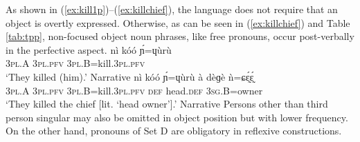 \documentclass[output=paper]{langscibook}
\begin{document}
As shown in (\ref{ex:kill1p})--(\ref{ex:killchief}), the language does not require that an object is overtly expressed. Otherwise, as can be seen in (\ref{ex:killchief}) and Table \ref{tab:tpp}, non-focused object noun phrases, like free pronouns, occur post-verbally in the perfective aspect.
\ea \label{ex:kill1p}
\gll nì kóó ɲ́=ɥùrù \\
3\textsc{pl}.A 3\textsc{pl}.\textsc{pfv} 3\textsc{pl}.B=kill.3\textsc{pl}.\textsc{pfv} \\
\glt `They killed (him).' Narrative \citep[~394]{HantganDiss}
\z
\ea \label{ex:killchief}
\gll nì kóó ɲ́=ɥùrù à dèɡè ǹ=ɕɛ̰́ɛ̰́\\
3\textsc{pl}.A 3\textsc{pl}.\textsc{pfv} 3\textsc{pl}.B=kill.3\textsc{pl}.\textsc{pfv} \textsc{def} head.\textsc{def} 3\textsc{sg}.B=owner\\
\glt `They killed the chief [lit. `head owner'].' Narrative \citep[~477]{HantganDiss}
\z 
Persons other than third person singular may also be omitted in object position but with lower frequency. On the other hand, pronouns of Set D are obligatory in reflexive constructions.

\end{document}
